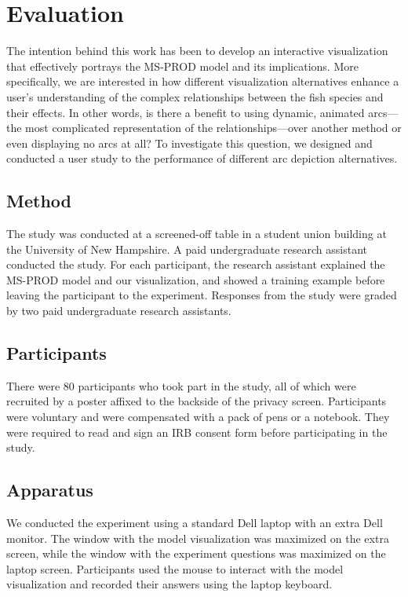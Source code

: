 \chapter{Evaluation}

The intention behind this work has been to develop an interactive visualization that effectively portrays the MS-PROD model and its implications.  More specifically, we are interested in how different visualization alternatives enhance a user's understanding of the complex relationships between the fish species and their effects.  In other words, is there a benefit to using dynamic, animated arcs---the most complicated representation of the relationships---over another method or even displaying no arcs at all?  To investigate this question, we designed and conducted a user study to the performance of different arc depiction alternatives.

\section{Method}

The study was conducted at a screened-off table in a student union building at the University of New Hampshire.  A paid undergraduate research assistant conducted the study.  For each participant, the research assistant explained the MS-PROD model and our visualization, and showed a training example before leaving the participant to the experiment.  Responses from the study were graded by two paid undergraduate research assistants.

\section{Participants}

There were 80 participants who took part in the study, all of which were recruited by a poster affixed to the backside of the privacy screen.  Participants were voluntary and were compensated with a pack of pens or a notebook.  They were required to read and sign an IRB consent form before participating in the study.

\section{Apparatus}

We conducted the experiment using a standard Dell laptop with an extra Dell monitor.  The window with the model visualization was maximized on the extra screen, while the window with the experiment questions was maximized on the laptop screen.  Participants used the mouse to interact with the model visualization and recorded their answers using the laptop keyboard.


